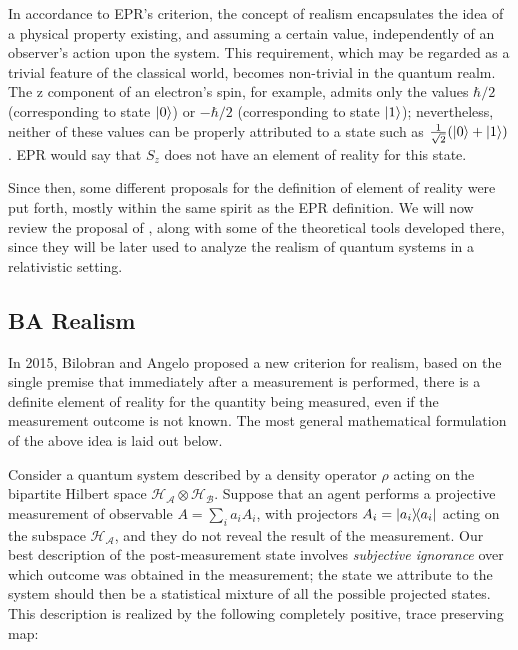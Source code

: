 \documentclass[12pt,a4paper,notitlepage]{report}
\begin{document}
In accordance to EPR's criterion, the concept of realism encapsulates the idea of a physical property existing, and assuming a certain value, independently of an observer's action upon the system. This requirement, which may be regarded as a trivial feature of the classical world, becomes non-trivial in the quantum realm. The z component of an electron's spin, for example, admits only the values $\hbar/2$ (corresponding to state $\ket{0}$) or $-\hbar/2$ (corresponding to state $\ket{1}$); nevertheless, neither of these values can be properly attributed to a state such as $\frac{1}{\sqrt{2}}(\ket{0}+\ket{1})$. EPR would say that $S_z$ does not have an element of reality for this state. 

Since then, some different proposals for the definition of element of reality were put forth\cite{redhead_1989, vaidman_1996, bilobran_angelo_2015}, mostly within the same spirit as the EPR definition. We will now review the proposal of \cite{bilobran_angelo_2015}, along with some of the theoretical tools developed there, since they will be later used to analyze the realism of quantum systems in a relativistic setting.


\subsection{BA Realism}
\label{ba}

In 2015, Bilobran and Angelo proposed a new criterion for realism, based on the single premise that immediately after a measurement is performed, there is a definite element of reality for the quantity being measured, even if the measurement outcome is not known. The most general mathematical formulation of the above idea is laid out below.

Consider a quantum system described by a density operator $\rho$ acting on the bipartite Hilbert space $\mathcal{H}_{\mathcal{A}} \otimes \mathcal{H}_{\mathcal{B}}$. Suppose that an agent performs a projective measurement of observable $A = \sum_i a_i A_i$, with projectors $A_i = \dyad{a_i}$ acting on the subspace $\mathcal{H}_{\mathcal{A}}$, and they do not reveal the result of the measurement. Our best description of the post-measurement state involves {\it subjective ignorance} over which outcome was obtained in the measurement; the state we attribute to the system should then be a statistical mixture of all the possible projected states.
This description is realized by the following completely positive, trace preserving map:
\end{document}
